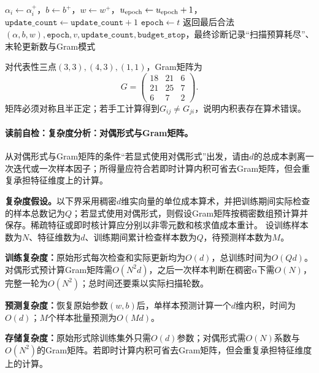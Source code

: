 \begin{AlgorithmContract}
\begin{algorithm}[H]
{{{      $\alpha_i\leftarrow\alpha_i^+$，$b\leftarrow b^+$，$w\leftarrow w^+$，$u_{\rm epoch}\leftarrow u_{\rm epoch}+1$，$\mathtt{update\_count}\leftarrow\mathtt{update\_count}+1$\;
    }
  }
  $\mathtt{epoch}\leftarrow t$\;
}
返回最后合法$(\alpha,b,w),\mathtt{epoch},v,\mathtt{update\_count},\mathtt{budget\_stop}$，最终诊断记录“扫描预算耗尽”、末轮更新数与Gram模式\;
\end{algorithm}
\end{AlgorithmContract}

对代表性三点$(3,3),(4,3),(1,1)$，Gram矩阵为
\[
G=\begin{pmatrix}18&21&6\\21&25&7\\6&7&2\end{pmatrix}.
\]
矩阵必须对称且半正定；若手工计算得到$G_{ij}\ne G_{ji}$，说明内积表存在算术错误。

\label{struct:V2-C01-CH26}
\label{struct:V2-C01-CH27}
\paragraph{读前自检：复杂度分析：对偶形式与Gram矩阵。}从对偶形式与Gram矩阵的条件“若显式使用对偶形式”出发，请由$d$的总成本剥离一次迭代或一次样本因子；所得量应符合若即时计算内积可省去Gram矩阵，但会重复承担特征维度上的计算。\par

\begin{complexitybox}
\textbf{复杂度假设。}以下界采用稠密$d$维实向量的单位成本算术，并把训练期间实际检查的样本总数记为$Q$；若显式使用对偶形式，则假设Gram矩阵按稠密数组预计算并保存。稀疏特征或即时核计算应分别以非零元数和核求值成本重计。
设训练样本数为$N$、特征维数为$d$、训练期间累计检查样本数为$Q$，待预测样本数为$M$。

\textbf{训练复杂度：}原始形式每次检查和实际更新均为$O(d)$，总训练时间为$O(Qd)$。对偶形式预计算Gram矩阵需$O(N^2d)$，之后一次样本判断在稠密$\alpha$下需$O(N)$，完整一轮为$O(N^2)$；总时间还要乘以实际扫描轮数。

\textbf{预测复杂度：}恢复原始参数$(w,b)$后，单样本预测计算一个$d$维内积，时间为$O(d)$；$M$个样本批量预测为$O(Md)$。

\textbf{存储复杂度：}原始形式除训练集外只需$O(d)$参数；对偶形式需$O(N)$系数与$O(N^2)$的Gram矩阵。若即时计算内积可省去Gram矩阵，但会重复承担特征维度上的计算。
\end{complexitybox}


